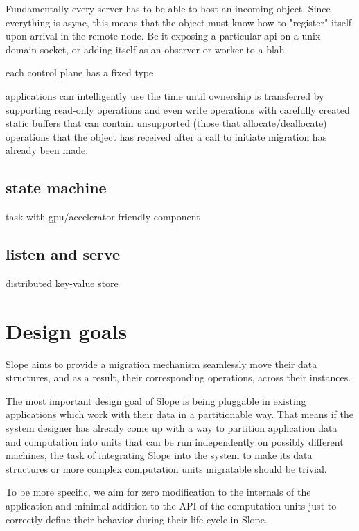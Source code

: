 
Fundamentally every server has to be able to host an incoming object.
Since everything is async, this means that the object must know how to
"register" itself upon arrival in the remote node. Be it exposing a particular
api on a unix domain socket, or adding itself as an observer or worker to a blah.

each control plane has a fixed type

applications can intelligently use the time until ownership is transferred by
supporting read-only operations and even write operations with carefully
created static buffers that can contain unsupported (those that allocate/deallocate)
operations that the object has received after a call to initiate migration has
already been made.


\subsection{state machine}
task with gpu/accelerator friendly component

\subsection{listen and serve}
distributed key-value store


\section{Design goals}

Slope aims to provide a migration mechanism 
seamlessly move their data structures, and as a result, their corresponding
operations, across their instances.

The most important design goal of Slope is being pluggable in existing
applications which work with their data in a partitionable way. That means if
the system designer has already come up with a way to partition
application data and computation into units that can be run independently on 
possibly different machines, the task of integrating Slope into the system
to make its data
structures or more complex computation units migratable should be trivial.

To be more specific, we aim for zero modification to the internals of the
application and minimal addition to the API of the computation units just to
correctly define their behavior during their life cycle in Slope.

